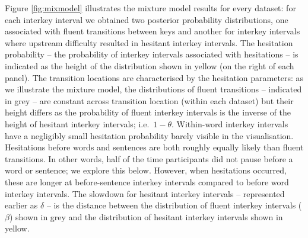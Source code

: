 \documentclass[
  man,floatsintext]{apa7}
\begin{document}
Figure \ref{fig:mixmodel} illustrates the mixture model results for every dataset: for each interkey interval we obtained two posterior probability distributions, one associated with fluent transitions between keys and another for interkey intervals where upstream difficulty resulted in hesitant interkey intervals. The hesitation probability -- the probability of interkey intervals associated with hesitations -- is indicated as the height of the distribution shown in yellow (on the right of each panel). The transition locations are characterised by the hesitation parameters: as we illustrate the mixture model, the distributions of fluent transitions -- indicated in grey -- are constant across transition location (within each dataset) but their height differs as the probability of fluent interkey intervals is the inverse of the height of hesitant interkey intervals; i.e.~\(1 - \theta\). Within-word interkey intervals have a negligibly small hesitation probability barely visible in the visualisation. Hesitations before words and sentences are both roughly equally likely than fluent transitions. In other words, half of the time participants did not pause before a word or sentence; we explore this below. However, when hesitations occurred, these are longer at before-sentence interkey intervals compared to before word interkey intervals. The slowdown for hesitant interkey intervals -- represented earlier as \(\delta\) -- is the distance between the distribution of fluent interkey intervals (\(\beta\)) shown in grey and the distribution of hesitant interkey intervals shown in yellow.
\end{document}
